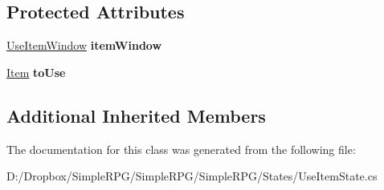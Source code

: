 \subsection*{Protected Attributes}
\begin{DoxyCompactItemize}
\item 
\hypertarget{class_simple_r_p_g_1_1_states_1_1_use_item_state_ab5539431d2b7e06ef317fc3b6c78307b}{\hyperlink{class_simple_r_p_g_1_1_windows_1_1_use_item_window}{Use\+Item\+Window} {\bfseries item\+Window}}\label{class_simple_r_p_g_1_1_states_1_1_use_item_state_ab5539431d2b7e06ef317fc3b6c78307b}

\item 
\hypertarget{class_simple_r_p_g_1_1_states_1_1_use_item_state_a51041aa7ab9a6782faa39ff990013593}{\hyperlink{class_simple_r_p_g_1_1_item}{Item} {\bfseries to\+Use}}\label{class_simple_r_p_g_1_1_states_1_1_use_item_state_a51041aa7ab9a6782faa39ff990013593}

\end{DoxyCompactItemize}
\subsection*{Additional Inherited Members}


The documentation for this class was generated from the following file\+:\begin{DoxyCompactItemize}
\item 
D\+:/\+Dropbox/\+Simple\+R\+P\+G/\+Simple\+R\+P\+G/\+Simple\+R\+P\+G/\+States/Use\+Item\+State.\+cs\end{DoxyCompactItemize}
